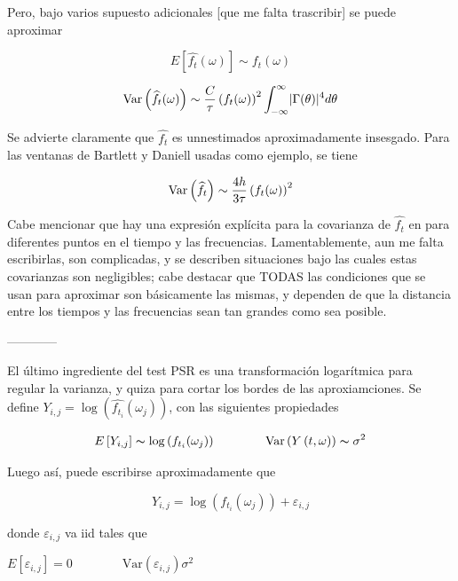 Pero, bajo varios supuesto adicionales [que me falta trascribir] se puede aproximar

\begin{equation*}
E\left[ \widehat{f_t}(\omega) \right] \sim f_t(\omega)
\end{equation*}

\begin{equation*}
\mathrm{Var}\left( \widehat{f_t}(\omega) \right) 
\sim 
\frac{C}{\tau} \left(f_t(\omega)\right)^{2} \int_{-\infty}^{\infty} \lvert \Gamma(\theta) \rvert^{4} d\theta
\end{equation*}

Se advierte claramente que $\widehat{f_t}$ es unnestimados aproximadamente insesgado.
Para las ventanas de Bartlett y Daniell usadas como ejemplo, se tiene

\begin{equation*}
\mathrm{Var}\left( \widehat{f_t} \right) 
\sim 
\frac{4h}{3\tau} \left(f_t(\omega)\right)^{2}
\end{equation*}

Cabe mencionar que hay una expresi\'on expl\'icita para la covarianza de $\widehat{f_t}$
en para diferentes puntos en el tiempo y las frecuencias. Lamentablemente,
aun me falta escribirlas, son complicadas, y se describen situaciones bajo las
cuales estas covarianzas son negligibles; cabe destacar que TODAS las condiciones 
que se usan para aproximar son b\'asicamente las mismas, y dependen de que la distancia
entre los tiempos y las frecuencias sean tan grandes como sea posible.

------------

El \'ultimo ingrediente del test PSR es una transformaci\'on logar\'itmica
para regular la varianza, y quiza para cortar los bordes de las aproxiamciones.
Se define $Y_{i,j} = \log \left( \widehat{f_{t_i}}(\omega_j) \right)$, con las siguientes propiedades

\begin{equation*}
E\left[ Y_{i,j} \right] \thicksim \log \left( f_{t_i}(\omega_j) \right)
\hspace{4em}
\text{Var}\left( {Y\left(t,\omega\right)}\right) \thicksim \sigma^{2}
\end{equation*}

Luego as\'i, puede escribirse aproximadamente que

$$Y_{i,j} = \log \left( f_{t_i}(\omega_j) \right) + \varepsilon_{i,j}$$

donde $\varepsilon_{i,j}$ va iid tales que

$
E\left[ \varepsilon_{i,j} \right] = 0
\hspace{4em}
\text{Var}\left( \varepsilon_{i,j} \right) \sigma^{2}
$

